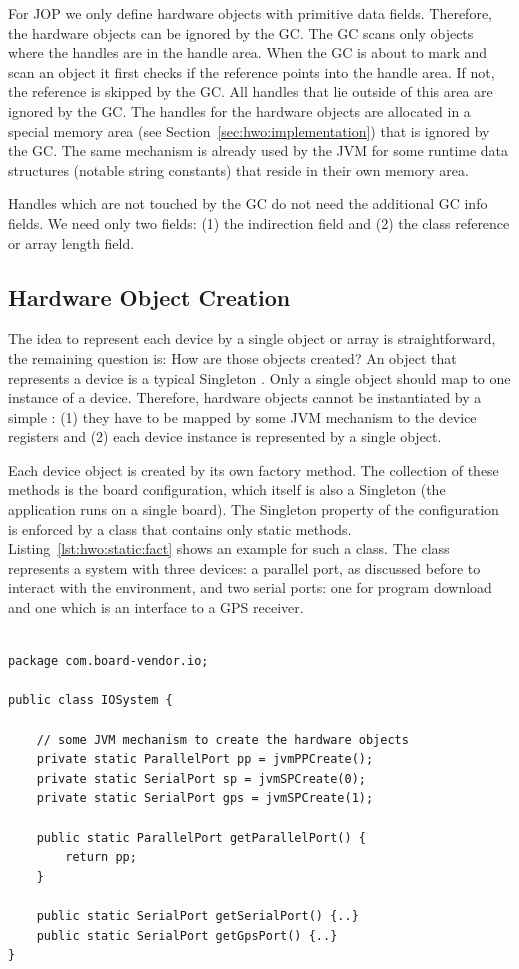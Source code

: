 For JOP we only define hardware objects with primitive data fields.
Therefore, the hardware objects can be ignored by the GC. The GC
scans only objects where the handles are in the handle area. When the
GC is about to mark and scan an object it first checks if the
reference points into the handle area. If not, the reference is
skipped by the GC. All handles that lie outside of this area are
ignored by the GC. The handles for the hardware objects are allocated
in a special memory area (see Section~\ref{sec:hwo:implementation})
that is ignored by the GC. The same mechanism is already used by the
JVM for some runtime data structures (notable string constants) that
reside in their own memory area.

Handles which are not touched by the GC do not need the additional GC
info fields. We need only two fields: (1) the indirection field and
(2) the class reference or array length field.

\subsection{Hardware Object Creation} \label{sec:factory}

The idea to represent each device by a single object or array is
straightforward, the remaining question is: How are those objects
created? An object that represents a device is a typical Singleton
\cite{Go4}. Only a single object should map to one instance of a
device. Therefore, hardware objects cannot be instantiated by a
simple : (1) they have to be mapped by some JVM mechanism
to the device registers and (2) each device instance is represented
by a single object.

Each device object is created by its own factory method. The
collection of these methods is the board configuration, which itself
is also a Singleton (the application runs on a single board). The
Singleton property of the configuration is enforced by a class that
contains only static methods. Listing~\ref{lst:hwo:static:fact} shows
an example for such a class. The class  represents a
system with three devices: a parallel port, as discussed before to
interact with the environment, and two serial ports: one for program
download and one which is an interface to a GPS receiver.

\begin{lstlisting}[float=t,caption={A factory with static methods for Singleton hardware objects},
label=lst:hwo:static:fact]

package com.board-vendor.io;

public class IOSystem {

    // some JVM mechanism to create the hardware objects
    private static ParallelPort pp = jvmPPCreate();
    private static SerialPort sp = jvmSPCreate(0);
    private static SerialPort gps = jvmSPCreate(1);

    public static ParallelPort getParallelPort() {
        return pp;
    }

    public static SerialPort getSerialPort() {..}
    public static SerialPort getGpsPort() {..}
}
\end{lstlisting}


